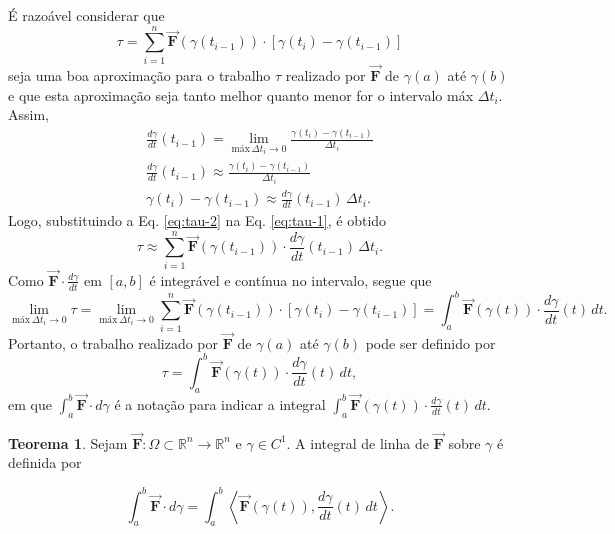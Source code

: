 \documentclass[11pt]{article}
\theoremstyle{definition}
\newtheorem{teorema}{Teorema}
\begin{document}
	É razoável considerar que
	\begin{equation}
		\tau=\sum_{i=1}^{n} \boldsymbol{\vec{F}}(\gamma (t_{i-1}))\cdot [\gamma(t_i)-\gamma(t_{i-1})]
		\label{eq:tau-1}
	\end{equation}
	seja uma boa aproximação para o trabalho $\tau$ realizado por $\boldsymbol{\vec{F}}$ de $\gamma(a)$ até $\gamma(b)$ e que esta aproximação seja tanto melhor quanto menor for o intervalo máx $\Delta t_i$. Assim,
	\begin{gather}
		\frac{d\gamma}{dt}(t_{i-1})=\lim_{\text{máx}\, \Delta t_i\to 0} \frac{\gamma(t_i)-\gamma(t_{i-1})}{\Delta t_i} \nonumber\\
		\frac{d\gamma}{dt}(t_{i-1})\approx \frac{\gamma(t_i)-\gamma(t_{i-1})}{\Delta t_i} \nonumber\\
		\gamma(t_i)-\gamma(t_{i-1})\approx \frac{d\gamma}{dt}(t_{i-1})\, \Delta t_i.
		\label{eq:tau-2}
	\end{gather}
	Logo, substituindo a Eq. \ref{eq:tau-2} na Eq. \ref{eq:tau-1}, é obtido
	\begin{equation*}
		\tau\approx \sum_{i=1}^{n}\boldsymbol{\vec{F}}(\gamma(t_{i-1}))\cdot \frac{d\gamma}{dt}(t_{i-1})\, \Delta t_i.
	\end{equation*}
	Como $\boldsymbol{\vec{F}}\cdot \frac{d\gamma}{dt}$ em $[a,b]$ é integrável e contínua no intervalo, segue que
	\begin{equation*}
		\lim_{\text{máx}\, \Delta t_i\to 0} \tau=\lim_{\text{máx}\, \Delta t_i\to 0} \sum_{i=1}^{n} \boldsymbol{\vec{F}}(\gamma (t_{i-1}))\cdot [\gamma(t_i)-\gamma(t_{i-1})]=\int_{a}^{b} \boldsymbol{\vec{F}}(\gamma(t))\cdot\frac{d\gamma}{dt}(t)\, dt.
	\end{equation*}
	Portanto, o trabalho realizado por $\boldsymbol{\vec{F}}$ de $\gamma(a)$ até $\gamma(b)$ pode ser definido por
	\begin{equation*}
		\tau=\int_{a}^{b} \boldsymbol{\vec{F}}(\gamma(t))\cdot\frac{d\gamma}{dt}(t)\, dt,
	\end{equation*}
	em que $\int_{a}^{b} \boldsymbol{\vec{F}}\cdot d\gamma$ é a notação para indicar a integral $\int_{a}^{b} \boldsymbol{\vec{F}}(\gamma(t))\cdot\frac{d\gamma}{dt}(t)\, dt$.
	\begin{teorema}
		Sejam $\boldsymbol{\vec{F}}:\Omega \subset \mathbb{R}^n\to \mathbb{R}^n$ e $\gamma\in C^1$. A integral de linha de $\boldsymbol{\vec{F}}$ sobre $\gamma$ é definida por
	\end{teorema}
	\begin{equation}
		\int_{a}^{b} \boldsymbol{\vec{F}}\cdot d\gamma=\int_{a}^{b} \left\langle \boldsymbol{\vec{F}}(\gamma(t)), \frac{d\gamma}{dt}(t)\, dt \right\rangle.
		\label{eq:integral-linha}
	\end{equation}
	
\end{document}
